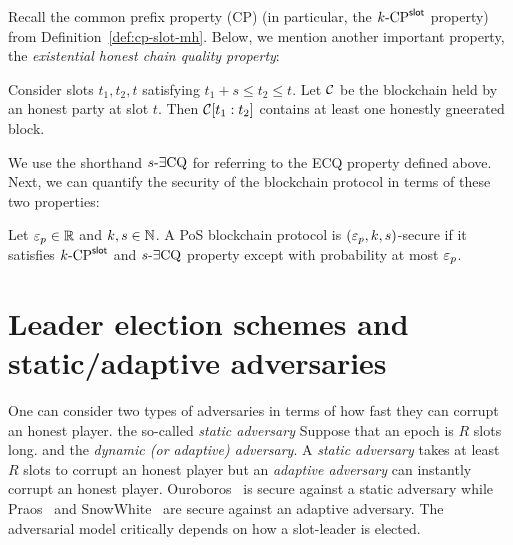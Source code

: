     Recall the common prefix property (CP) (in particular, the ${k}\text{-}\mathrm{CP}^{\mathsf{slot}}$ property) 
    from Definition~\ref{def:cp-slot-mh}. 
    Below, we mention another important property, 
    the \emph{existential honest chain quality property}: 


    \begin{definition}\label{def:ECQ}        
        Consider slots $t_1, t_2, t$ satisfying $t_1 + s \leq t_2 \leq t$. 
        Let $\mathcal{C}$ be the blockchain held by an honest party at slot $t$. 
        Then $\mathcal{C}[t_1:t_2]$ contains at least one 
        honestly gneerated block.
    \end{definition}
    We use the shorthand ${s}\text{-}\exists\mathrm{CQ}$ for referring to the ECQ property defined above. 
    Next, we can quantify the security of the blockchain protocol in terms of these two properties:

    \begin{definition}\label{def:blockchain-security}
        Let $\mathsf{\varepsilon}_p \in \mathbb{R}$ and $k, s \in \mathbb{N}$. 
        A PoS blockchain protocol is $(\mathsf{\varepsilon}_p, k, s)$-secure if 
        it satisfies ${k}\text{-}\mathrm{CP}^{\mathsf{slot}}$ and ${s}\text{-}\exists\mathrm{CQ}$ property 
        except with probability at most $\mathsf{\varepsilon}_p$.
    \end{definition}



\section{Leader election schemes and static/adaptive adversaries}\label{sec:leader-election-public-private}\label{sec:static-dynamic-adversary}

One can consider two types of adversaries in terms of 
how fast they can corrupt an honest player. the so-called \emph{static adversary} 
Suppose that an epoch is $R$ slots long. 
and the \emph{dynamic (or adaptive) adversary}. 
A \emph{static adversary} takes at least $R$ slots to corrupt an honest player 
but an \emph{adaptive adversary} can instantly corrupt an honest player. 
Ouroboros~\cite {Ouroboros} is secure against a static adversary 
while Praos~\cite {Praos} and SnowWhite~\cite{SnowWhite} 
are secure against an adaptive adversary.
The adversarial model critically depends on how a slot-leader is elected. 

